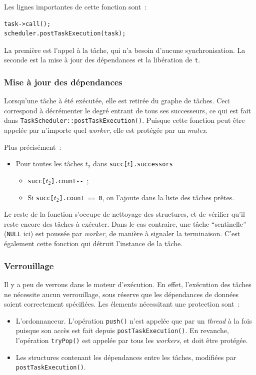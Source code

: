 \documentclass[11pt]{article}
\theoremstyle{plain} %
\theoremstyle{definition} %
\begin{document}
Les lignes importantes de cette fonction sont~:
\begin{lstlisting}
task->call();
scheduler.postTaskExecution(task);
\end{lstlisting}

La première est l'appel à la tâche, qui n'a besoin d'aucune synchronisation.
La seconde est la mise à jour des dépendances et la libération de \texttt{t}.

\subsubsection{Mise à jour des dépendances}
\label{sec:mise-jour-des}
Lorsqu'une tâche à été exécutée, elle est retirée du graphe de tâches.
Ceci correspond à décrémenter le degré entrant de tous ses successeurs, ce qui est fait dans \texttt{TaskScheduler::postTaskExecution()}.
Puisque cette fonction peut être appelée par n'importe quel \emph{worker}, elle est protégée par un \emph{mutex}.

Plus précisément~:
\begin{itemize}
\item Pour toutes les tâches $t_2$ dans \texttt{succ[$t$].successors}
  \begin{itemize}
  \item \texttt{succ[$t_2$].count-{}-}~;
  \item Si \texttt{succ[$t_2$].count == 0}, on l'ajoute dans la liste des tâches prêtes.
  \end{itemize}
\end{itemize}

Le reste de la fonction s'occupe de nettoyage des structures, et de vérifier qu'il reste encore des tâches à exécuter.
Dans le cas contraire, une tâche ``sentinelle'' (\texttt{NULL} ici) est poussée par \emph{worker}, de manière à signaler la terminaison.
C'est également cette fonction qui détruit l'instance de la tâche.

\subsubsection{Verrouillage}
\label{sec:verrouillage}
Il y a peu de verrous dans le moteur d'exécution.
En effet, l'exécution des tâches ne nécessite aucun verrouillage, sous réserve que les dépendances de données soient correctement spécifiées.
Les élements nécessitant une protection sont~:~
\begin{itemize}
\item L'ordonnanceur. L'opération \texttt{push()} n'est appelée que par un \emph{thread} à la fois puisque son accès est fait depuis \texttt{postTaskExecution()}.
  En revanche, l'opération \texttt{tryPop()} est appelée par tous les \emph{workers}, et doit être protégée.
\item Les structures contenant les dépendances entre les tâches, modifiées par \texttt{postTaskExecution()}.
\end{itemize}
\end{document}
